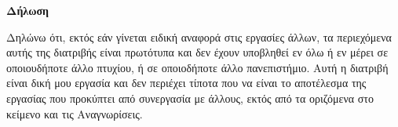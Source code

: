 \begin{center}
    \Large\textbf{Δήλωση}
\end{center}

\hspace{2cm}

Δηλώνω ότι, εκτός εάν γίνεται ειδική αναφορά στις εργασίες άλλων,
τα περιεχόμενα αυτής της διατριβής είναι πρωτότυπα και δεν έχουν
υποβληθεί εν όλω ή εν μέρει σε οποιουδήποτε άλλο πτυχίου, ή σε οποιοδήποτε
άλλο πανεπιστήμιο. Αυτή η διατριβή είναι δική μου εργασία και δεν περιέχει
τίποτα που να είναι το αποτέλεσμα της εργασίας που προκύπτει από συνεργασία με
άλλους, εκτός από τα οριζόμενα στο κείμενο και τις Αναγνωρίσεις.\\


